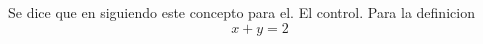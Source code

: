 \documentclass[11pt,a4paper]{book}
\begin{document}
 Se dice que  en \cite{khalil:2002} siguiendo este concepto para el. El control. Para la definicion
\begin{equation}
    x+y=2
\end{equation}


\end{document}
